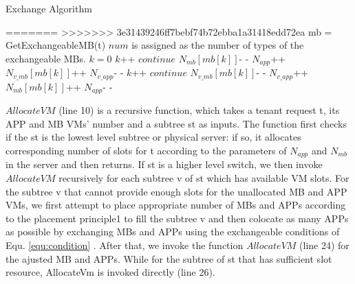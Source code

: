 \documentclass[review]{elsarticle}
\begin{document}
\begin{algorithm}
	\caption{Exchange Algorithm}
	\begin{algorithmic}[1]
=======
>>>>>>> 3e31439246ff7bebf74b72ebba1a31418edd72ea
	   \State mb = GetExchangeableMB(t)
	       \State $num$ is assigned as the number of types
	       \State of the exchangeable MBs.
	       \State $k = 0$
				   \State $k$++
				   \State $continue$
			   \EndIf
			   \State $N_{mb}[mb[k]]$- -
			   \State $N_{app}$++
		 	   \State $N_{v\_mb}[mb[k]]$++
			   \State $N_{v\_app}$- -
			\EndWhile
	    \Else
			   \State $k$++
			   \State $continue$
			\EndIf
			\State $N_{v\_mb}[mb[k]]$- -
			\State $N_{v\_app}$++
			\State $N_{mb}[mb[k]]$++
			\State $N_{app}$- -
		 \EndWhile
	   \EndIf
	  \EndIf
   \EndFunction    
  \end{algorithmic}
   
\end{algorithm}		

 $AllocateVM$ (line 10) is a recursive function, which takes a tenant request t, its APP and MB VMs’ number and a subtree st as inputs. The function first checks if the st is the lowest level subtree or physical server: if so, it allocates corresponding number of slots for t according to the parameters of $N_{app}$ and $N_{mb}$ in the server and then returns. If st is a higher level switch, we then invoke $AllocateVM$ recursively for each subtree v of st which has available VM slots. For the subtree v that cannot provide enough slots for the unallocated MB and APP VMs, we first attempt to place appropriate number of MBs and APPs according to the placement principle1 to fill the subtree v and then colocate as many APPs as possible by exchanging MBs and APPs using the exchangeable conditions of Equ. \ref{equ:condition} . After that, we invoke the function $AllocateVM$ (line 24) for the ajusted MB and APPs. While for the subtree of st that has sufficient slot resource, AllocateVm is invoked directly (line 26). 
\end{document}
